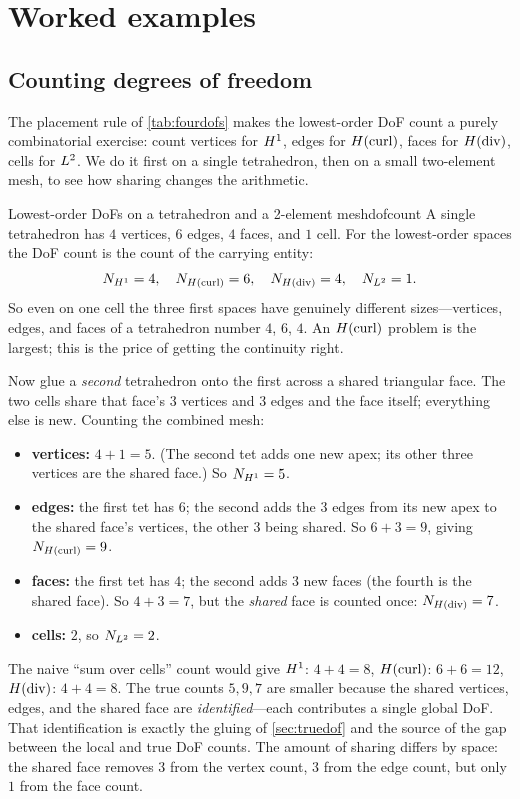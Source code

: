 \section{Worked examples}

\subsection{Counting degrees of freedom}

The placement rule of \cref{tab:fourdofs} makes the lowest-order DoF count a purely combinatorial
exercise: count vertices for $H^1$, edges for $H(\mathrm{curl})$, faces for $H(\mathrm{div})$, cells for $L^2$. We do
it first on a single tetrahedron, then on a small two-element mesh, to see how sharing changes the
arithmetic.

\begin{workedexample}{Lowest-order DoFs on a tetrahedron and a 2-element mesh}{dofcount}
A single tetrahedron has $4$ vertices, $6$ edges, $4$ faces, and $1$ cell. For the lowest-order
spaces the DoF count is the count of the carrying entity:
\[
  N_{H^1} = 4, \quad N_{H(\mathrm{curl})} = 6, \quad N_{H(\mathrm{div})} = 4, \quad N_{L^2} = 1.
\]
So even on one cell the three first spaces have genuinely different sizes---vertices, edges, and faces
of a tetrahedron number $4$, $6$, $4$. An $H(\mathrm{curl})$ problem is the largest; this is the price of getting
the continuity right.

Now glue a \emph{second} tetrahedron onto the first across a shared triangular face. The two cells share
that face's $3$ vertices and $3$ edges and the face itself; everything else is new. Counting the
combined mesh:
\begin{itemize}[nosep]
\item \textbf{vertices:} $4 + 1 = 5$. (The second tet adds one new apex; its other three vertices are
  the shared face.) So $N_{H^1} = 5$.
\item \textbf{edges:} the first tet has $6$; the second adds the $3$ edges from its new apex to the
  shared face's vertices, the other $3$ being shared. So $6 + 3 = 9$, giving $N_{H(\mathrm{curl})} = 9$.
\item \textbf{faces:} the first tet has $4$; the second adds $3$ new faces (the fourth is the shared
  face). So $4 + 3 = 7$, but the \emph{shared} face is counted once: $N_{H(\mathrm{div})} = 7$.
\item \textbf{cells:} $2$, so $N_{L^2} = 2$.
\end{itemize}
The naive ``sum over cells'' count would give $H^1$: $4+4=8$, $H(\mathrm{curl})$: $6+6=12$, $H(\mathrm{div})$:
$4+4=8$. The true counts $5,9,7$ are smaller because the shared vertices, edges, and the shared face
are \emph{identified}---each contributes a single global DoF. That identification is exactly the
gluing of \cref{sec:truedof} and the source of the gap between the local and true DoF counts. The
amount of sharing differs by space: the shared face removes $3$ from the vertex count, $3$ from the
edge count, but only $1$ from the face count.
\end{workedexample}

